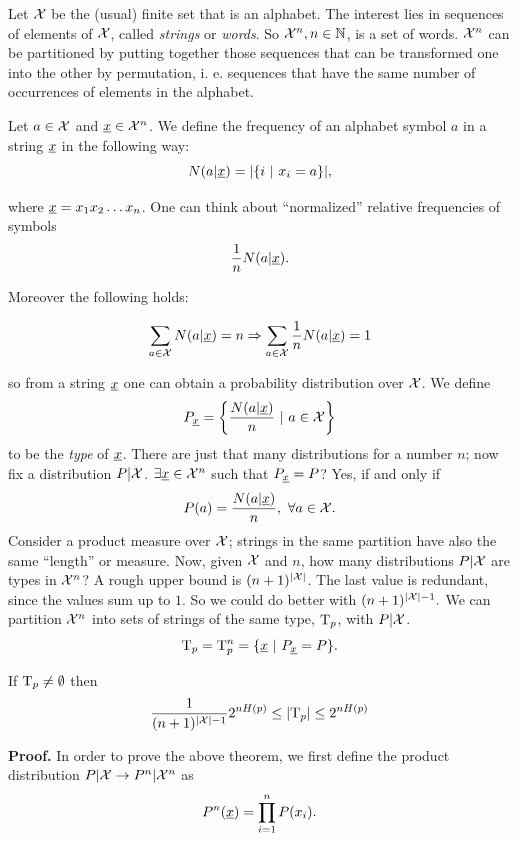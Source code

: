 Let $\mathcal{X}$ be the (usual) finite set that is an alphabet. The interest lies in sequences of elements of $\mathcal{X}$, called \emph{strings} or \emph{words}. So $\mathcal{X}^n, n \in \mathbb{N}$, is a set of words. $\mathcal{X}^n$ can be partitioned by putting together those sequences that can be transformed one into the other by permutation, i. e. sequences that have the same number of occurrences of elements in the alphabet.

Let $a \in \mathcal{X}$ and $\underline{x} \in \mathcal{X}^n$. We define the frequency of an alphabet symbol $a$ in a string $\underline{x}$ in the following way:  
\begin{equation}
N(a | \underline{x}) = |\{i\ |\ x_i = a\}|,
\end{equation}

where $\underline{x} = x_1x_2\ldots x_n$. One can think about ``normalized'' relative frequencies of symbols $$\dfrac{1}{n} N(a|\underline{x}).$$

Moreover the following holds:

$$\sum_{a \in \mathcal{X}} N(a|\underline{x}) = n \Rightarrow \sum_{a\in \mathcal{X}} \dfrac{1}{n}N(a|\underline{x}) = 1$$

so from a string $\underline{x}$ one can obtain a probability distribution over $\mathcal{X}$. We define
\begin{equation}
	P_{\str{x}} = \left\{ \dfrac{N(a|\str{x})}{n}\ |\ a \in \xset \right\}
\end{equation}
to be the \emph{type} of $\underline{x}$. There are just that many distributions for a number $n$; now fix a distribution $P|\mathcal{X}$. $\exists \underline{x} \in \mathcal{X}^n$ such that  $P_{\underline{x}} = P$? Yes, if and only if
$$P(a) = \dfrac{N(a | \underline{x})}{n},\ \forall a \in \mathcal{X}.$$ Consider a product measure over $\mathcal{X}$; strings in the same partition have also the same ``length'' or measure. Now, given $\mathcal{X}$ and $n$, how many distributions $P|\mathcal{X}$ are types in $\mathcal{X}^n$? A rough upper bound is $(n + 1)^{|\mathcal{X}|}$. The last value is redundant, since the values sum up to $1$. So we could do better with $(n + 1)^{|\mathcal{X}| - 1}.$ We can partition $\mathcal{X}^n$ into sets of strings of the same type, $\mathrm{T}_p$, with $P|\mathcal{X}$. $$\mathrm{T}_p = \mathrm{T}_p^n = \{\underline{x}\ |\ P_{\underline{x}} = P\}.$$

\begin{thm} \label{thms:taupcard}
	If $\mathrm{T}_p \not= \emptyset$ then $$\dfrac{1}{(n+1)^{|\mathcal{X}| -1}}2^{nH(p)}\leq |\mathrm{T}_p| \leq 2^{nH(p)}$$
\end{thm}

\noindent\textbf{Proof.} In order to prove the above theorem, we first define the product distribution $P|\mathcal{X} \rightarrow P^n|\mathcal{X}^n$ as 
\begin{equation}
	P^n(\underline{x}) = \prod_{i = 1}^nP(x_i).
\end{equation}

